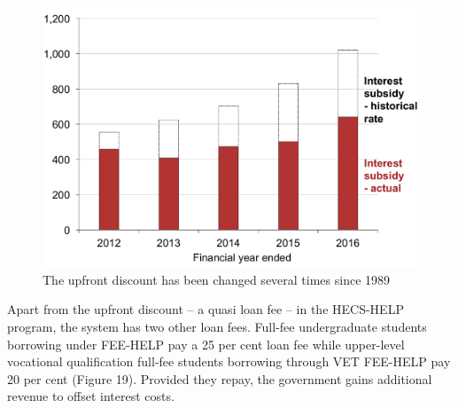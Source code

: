 \documentclass[embargoed]{grattan}
\begin{document}
\begin{figure}
\caption{The upfront discount has been changed several times since 1989}\label{fig:fig18-the-upfront-discount-has-been-changed-several-times-since-1989}

\includegraphics[page=18]{atlas/Chartpack.pdf}

\end{figure}

Apart from the upfront discount -- a quasi loan fee -- in the HECS-HELP program, the system has two other loan fees.
Full-fee undergraduate students borrowing under FEE-HELP pay a 25 per cent loan fee while upper-level vocational qualification full-fee students borrowing through VET FEE-HELP pay 20 per cent (Figure 19).
Provided they repay, the government gains additional revenue to offset interest costs.
\end{document}
